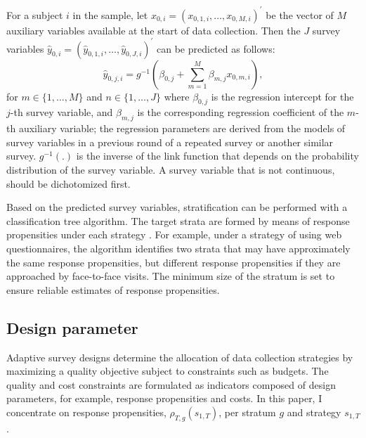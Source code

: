 \documentclass[11pt]{article}
\begin{document}

For a subject $i$ in the sample, let $x_{0,i}=(x_{0,1,i},\dots,x_{0,M,i})^{'}$ be the vector of $M$ auxiliary variables available at the start of data collection. Then the $J$ survey variables $\hat{y}_{0,i}=(\hat{y}_{0,1,i},\dots,\hat{y}_{0,J,i})^{'}$ can be predicted as follows:
\begin{equation}
    \hat{y}_{0,j,i}=g^{-1}\left(\beta_{0,j}+\sum^M_{m=1}\beta_{m,j}x_{0,m,i} \right),
\end{equation}
for $m \in \{1,\dots,M\}$ and $n \in \{1,\dots,J\}$ where $\beta_{0,j}$ is the regression intercept for the $j$-th survey variable, and $\beta_{m,j}$ is the corresponding regression coefficient of the $m$-th auxiliary variable; the regression parameters are derived from the models of survey variables in a previous round of a repeated survey or another similar survey. $g^{-1}(.)$ is the inverse of the link function that depends on the probability distribution of the survey variable. A survey variable that is not continuous, should be dichotomized first.

Based on the predicted survey variables, stratification can be performed with a classification tree algorithm. The target strata are formed by means of response propensities under each strategy \cite{Berkel:2020}. For example, under a strategy of using web questionnaires, the algorithm identifies two strata that may have approximately the same response propensities, but different response propensities if they are approached by face-to-face visits. The minimum size of the stratum is set to ensure reliable estimates of response propensities.


\subsection{Design parameter}
\label{sec:parameter}

Adaptive survey designs determine the allocation of data collection strategies by maximizing a quality objective subject to constraints such as budgets. The quality and cost constraints are formulated as indicators composed of design parameters, for example, response propensities and costs. In this paper, I concentrate on response propensities, $\rho_{T,g}(s_{1,T})$, per stratum $g$ and strategy $s_{1,T}$.
\end{document}
